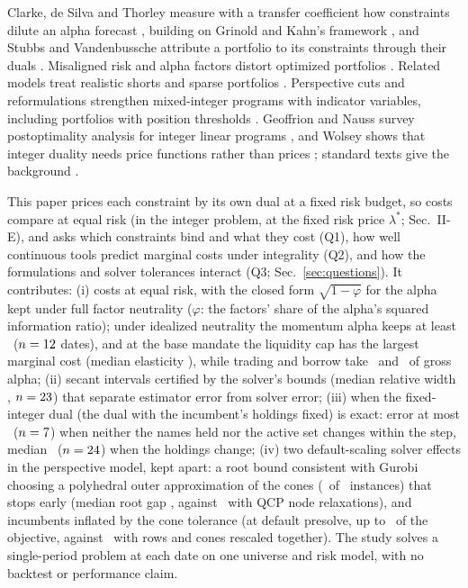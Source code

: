 \documentclass[conference]{IEEEtran}
\begin{document}
Clarke, de Silva and Thorley measure with a transfer coefficient how constraints dilute an alpha forecast \cite{clarke2002portfolio}, building on Grinold and Kahn's framework \cite{grinold2000active}, and Stubbs and Vandenbussche attribute a portfolio to its constraints through their duals \cite{stubbs2010constraint}. Misaligned risk and alpha factors distort optimized portfolios \cite{lee2008risk,ceria2012factor}. Related models treat realistic shorts \cite{jacobs2005portfolio} and sparse portfolios \cite{bertsimas2022scalable}. Perspective cuts and reformulations strengthen mixed-integer programs with indicator variables, including portfolios with position thresholds \cite{frangioni2006perspective,gunluk2010perspective}. Geoffrion and Nauss survey postoptimality analysis for integer linear programs \cite{geoffrion1977parametric}, and Wolsey shows that integer duality needs price functions rather than prices \cite{wolsey1981integer}; standard texts give the background \cite{boyd2004convex,wolsey2020integer}.

This paper prices each constraint by its own dual at a fixed risk budget, so costs compare at equal risk (in the integer problem, at the fixed risk price $\lambda^*$; Sec.~II-E), and asks which constraints bind and what they cost (Q1), how well continuous tools predict marginal costs under integrality (Q2), and how the formulations and solver tolerances interact (Q3; Sec.~\ref{sec:questions}). It contributes:
(i) costs at equal risk, with the closed form $\sqrt{1-\varphi}$ for the alpha kept under full factor neutrality ($\varphi$: the factors' share of the alpha's squared information ratio); under idealized neutrality the momentum alpha keeps at least \IdealRetMomMin\ ($n=12$ dates), and at the base mandate the liquidity cap has the largest marginal cost (median elasticity \ELiqMed), while trading and borrow take \SplitTradeMed\ and \SplitBorrowMed\ of gross alpha;
(ii) secant intervals certified by the solver's bounds (median relative width \WidthMed, $n=23$) that separate estimator error from solver error;
(iii) when the fixed-integer dual (the dual with the incumbent's holdings fixed) is exact: error at most \PredOneMax\ ($n=7$) when neither the names held nor the active set changes within the step, median \PredThreeMed\ ($n=24$) when the holdings change;
(iv) two default-scaling solver effects in the perspective model, kept apart: a root bound consistent with Gurobi choosing a polyhedral outer approximation of the cones (\NThreeEOneDef\ of \NThreeN\ instances) that stops early (median root gap \NThreeGapDef, against \NThreeGapMZero\ with QCP node relaxations), and incumbents inflated by the cone tolerance (at default presolve, up to \ConeDefMax\ of the objective, against \ConeRescMax\ with rows and cones rescaled together).
The study solves a single-period problem at each date on one universe and risk model, with no backtest or performance claim.
\end{document}
